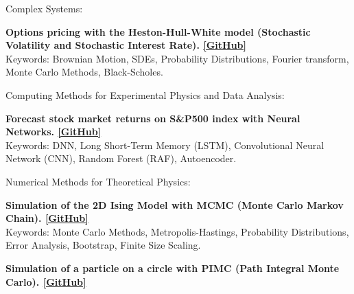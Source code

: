\begin{cventries}
  \cventry
    {} %
    {\hspace{-0.58mm} Complex Systems:} %
    {} %
    {} %
    {
      \begin{cvitemss} %
       \item {\textbf{Options pricing with the Heston-Hull-White model (Stochastic Volatility and Stochastic Interest Rate).
       \href{https://github.com/RaffaeleParadiso/HHW-Model}{[GitHub]}\\}}
        Keywords: Brownian Motion, SDEs, Probability Distributions, Fourier transform, Monte Carlo Methods, Black-Scholes.\\
      \end{cvitemss}
    }
    \vspace{-0.4mm}
  \cventry
    {} %
    {Computing Methods for Experimental Physics and Data Analysis:} %
    {} %
    {} %
    {
      \begin{cvitemss} %
        \item {\textbf{Forecast stock market returns on S\&P500 index with Neural Networks.
        \href{https://github.com/RaffaeleParadiso/PortfolioML}{[GitHub]}\\}}
        Keywords: DNN, Long Short-Term Memory (LSTM), Convolutional Neural Network (CNN), Random Forest (RAF), Autoencoder.\\
      \end{cvitemss}
    }
    \vspace{-0.4mm}
  \cventry
    {} %
    {Numerical Methods for Theoretical Physics:} %
    {} %
    {} %
    {
      \begin{cvitemss} %
        \item {\textbf{Simulation of the 2D Ising Model with MCMC (Monte Carlo Markov Chain).
        \href{https://github.com/RaffaeleParadiso/IsingModelMC}{[GitHub]}\\}}
        Keywords: Monte Carlo Methods, Metropolis-Hastings, Probability Distributions, Error Analysis, Bootstrap, Finite Size Scaling.\\
        \item {\textbf{Simulation of a particle on a circle with PIMC (Path Integral Monte Carlo). \href{https://github.com/RaffaeleParadiso/PathIntegralMonteCarlo}{[GitHub]}\\}}

\end{cvitemss}}
\end{cventries}
